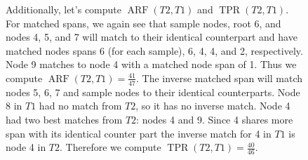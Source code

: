 \documentclass[10pt,twoside,lineno]{gsajnl}
\begin{document}
\begin{figure}[!ht]
\begin{center}
{        Additionally, let's compute $\operatorname{ARF}(T2,T1)$ and $\operatorname{TPR}(T2,T1)$.
        For matched spans, we again see that sample nodes, root 6, and nodes 4, 5, and 7 will match to their identical counterpart
        and have matched nodes spans 6 (for each sample), 6, 4, 4, and 2, respectively.
        Node 9 matches to node 4 with a matched node span of 1. Thus we compute $\operatorname{ARF}(T2,T1)=\frac{41}{47}$. 
        The inverse matched span will match nodes 5, 6, 7 and sample nodes to their identical counterparts. 
        Node 8 in $T1$ had no match from $T2$, so it has no inverse match. Node 4 had two best matches from $T2$: nodes 4 and 9.
        Since 4 shares more span with its identical counter part the inverse match for 4 in $T1$ is node 4 in $T2$. Therefore we compute 
        $\operatorname{TPR}(T2,T1)=\frac{40}{46}$. 
        \label{fig:conceptual_discrepancy}
    }
	\end{center}
\end{figure}

\end{document}
